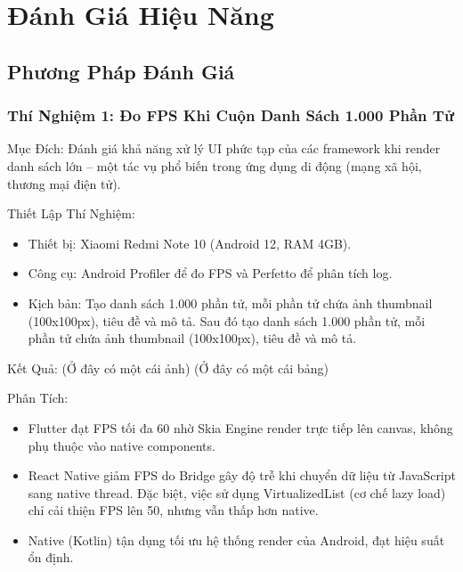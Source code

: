 \section{Đánh Giá Hiệu Năng}

\subsection{Phương Pháp Đánh Giá}
\renewcommand{\labelitemi}{--}    
\subsubsection{Thí Nghiệm 1: Đo FPS Khi Cuộn Danh Sách 1.000 Phần Tử}
\begin{flushleft}
  \hspace*{0.8cm}Mục Đích: Đánh giá khả năng xử lý UI phức tạp của các framework khi render danh sách lớn – một tác vụ phổ biến trong ứng dụng di động (mạng xã hội, thương mại điện tử).
\end{flushleft}

\begin{flushleft}
  \hspace*{0.8cm}Thiết Lập Thí Nghiệm:
  \setlength{\leftmargini}{1.5cm}
  \begin{itemize}
      \item Thiết bị: Xiaomi Redmi Note 10 (Android 12, RAM 4GB).
      \item Công cụ: Android Profiler để đo FPS và Perfetto để phân tích log.
      \item Kịch bản: Tạo danh sách 1.000 phần tử, mỗi phần tử chứa ảnh thumbnail (100x100px), tiêu đề và mô tả. Sau đó tạo danh sách 1.000 phần tử, mỗi phần tử chứa ảnh thumbnail (100x100px), tiêu đề và mô tả.
  \end{itemize}
\end{flushleft}

\begin{flushleft}
  \hspace*{0.8cm}Kết Quả: (Ở đây có một cái ảnh) (Ở đây có một cái bảng)
\end{flushleft}

\begin{flushleft}
  \hspace*{0.8cm}Phân Tích:
  \setlength{\leftmargini}{1.5cm}
  \begin{itemize}
      \item Flutter đạt FPS tối đa 60 nhờ Skia Engine render trực tiếp lên canvas, không phụ thuộc vào native components.
      \item React Native giảm FPS do Bridge gây độ trễ khi chuyển dữ liệu từ JavaScript sang native thread. Đặc biệt, việc sử dụng VirtualizedList (cơ chế lazy load) chỉ cải thiện FPS lên 50, nhưng vẫn thấp hơn native.
      \item Native (Kotlin) tận dụng tối ưu hệ thống render của Android, đạt hiệu suất ổn định.
  \end{itemize}
\end{flushleft}

